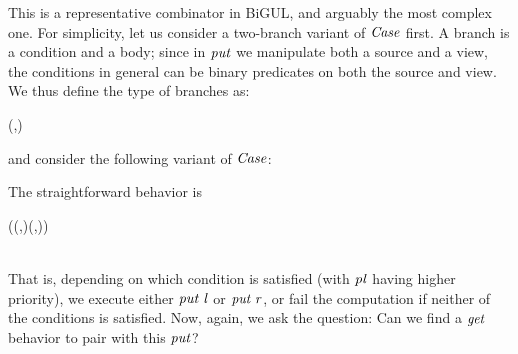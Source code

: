 This is a representative combinator in BiGUL, and arguably the most complex one.
For simplicity, let us consider a two-branch variant of \ensuremath{\Conid{Case}} first.
A branch is a condition and a body; since in \ensuremath{\Varid{put}} we manipulate both a source and a view, the conditions in general can be binary predicates on both the source and view.
We thus define the type of branches as:
\begin{hscode}\SaveRestoreHook
{}%
%
\>[B]{}\;\;\;\mathrel{=}(\to {}\to {},\;\;){}\<[E]%
\ColumnHook
\end{hscode}\resethooks
and consider the following variant of \ensuremath{\Conid{Case}}:
\begin{hscode}\SaveRestoreHook
{}%
%
\>[B]{}\mathbin{::}\;\;\to {}\;\;\to {}\;\;\<[E]%
\ColumnHook
\end{hscode}\resethooks
The straightforward behavior is
\begin{hscode}\SaveRestoreHook
{}%
%
%
%
%
%
%
%
\>[B]{}\;(\;(,)\;(,))\;\;\mathrel{=}{}\<[35]%
\>[35]{}\;{}\<[44]%
\>[44]{}\;{}\<[48]%
\>[48]{}\;\;{}\<[53]%
\>[53]{}\;{}\<[59]%
\>[59]{}\;\;{}\<[66]%
\>[66]{}\;\<[E]%
\\
\>[35]{}\;\;{}\<[44]%
\>[44]{}\;{}\<[48]%
\>[48]{}\;\;{}\<[53]%
\>[53]{}\;{}\<[59]%
\>[59]{}\;\;{}\<[66]%
\>[66]{}\;\<[E]%
\\
\>[35]{}\;\<[E]%
\ColumnHook
\end{hscode}\resethooks
That is, depending on which condition is satisfied (with \ensuremath{\Varid{pl}} having higher priority), we execute either \ensuremath{\Varid{put}\;\Varid{l}} or \ensuremath{\Varid{put}\;\Varid{r}}, or fail the computation if neither of the conditions is satisfied.
Now, again, we ask the question: Can we find a \ensuremath{\Varid{get}} behavior to pair with this \ensuremath{\Varid{put}}?

